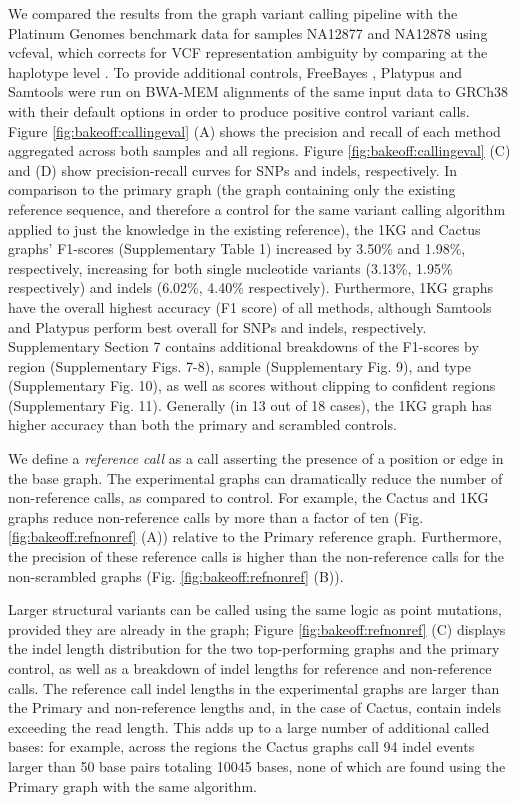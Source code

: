We compared the results from the graph variant calling pipeline with the
Platinum Genomes benchmark data for samples NA12877 and
NA12878\cite{Eberle2016-zc} using vcfeval, which corrects for VCF
representation ambiguity by comparing at the haplotype level
\cite{Cleary2015-oy} \cite{Zook2014-tl}. To provide additional controls,
FreeBayes \cite{garrison2012haplotype}, Platypus \cite{Rimmer2014-zj} and
Samtools \cite{Li2009-je} were run on BWA-MEM \cite{li2009fast}
alignments of the same input data to GRCh38 with their default options
in order to produce positive control variant calls. Figure \ref{fig:bakeoff:callingeval} (A) shows
the precision and recall of each method aggregated across both samples
and all regions. Figure \ref{fig:bakeoff:callingeval} (C) and (D) show precision-recall curves for
SNPs and indels, respectively. In comparison to the primary graph (the
graph containing only the existing reference sequence, and therefore a
control for the same variant calling algorithm applied to just the
knowledge in the existing reference), the 1KG and Cactus graphs'
F1-scores (Supplementary Table 1) increased by 3.50\% and 1.98\%,
respectively, increasing for both single nucleotide variants (3.13\%,
1.95\% respectively) and indels (6.02\%, 4.40\% respectively).
Furthermore, 1KG graphs have the overall highest accuracy (F1 score) of
all methods, although Samtools and Platypus perform best overall for
SNPs and indels, respectively. Supplementary Section 7 contains
additional breakdowns of the F1-scores by region (Supplementary Figs.
7-8), sample (Supplementary Fig. 9), and type (Supplementary Fig. 10),
as well as scores without clipping to confident regions (Supplementary
Fig. 11). Generally (in 13 out of 18 cases), the 1KG graph has higher
accuracy than both the primary and scrambled controls.

We define a \emph{reference} \emph{call} as a call asserting the
presence of a position or edge in the base graph. The experimental
graphs can dramatically reduce the number of non-reference calls, as
compared to control. For example, the Cactus and 1KG graphs reduce
non-reference calls by more than a factor of ten (Fig. \ref{fig:bakeoff:refnonref} (A)) relative
to the Primary reference graph. Furthermore, the precision of these
reference calls is higher than the non-reference calls for the
non-scrambled graphs (Fig. \ref{fig:bakeoff:refnonref} (B)).

Larger structural variants can be called using the same logic as point
mutations, provided they are already in the graph; Figure \ref{fig:bakeoff:refnonref} (C) displays
the indel length distribution for the two top-performing graphs and the
primary control, as well as a breakdown of indel lengths for reference
and non-reference calls. The reference call indel lengths in the
experimental graphs are larger than the Primary and non-reference
lengths and, in the case of Cactus, contain indels exceeding the read
length. This adds up to a large number of additional called bases: for
example, across the regions the Cactus graphs call 94 indel events
larger than 50 base pairs totaling 10045 bases, none of which are found
using the Primary graph with the same algorithm.

